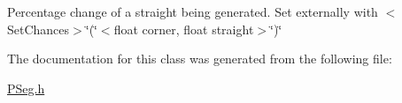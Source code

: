 Percentage change of a straight being generated. Set externally with $<$\-Set\-Chances$>$\char`\"{}(\char`\"{}$<$float corner, float straight$>$\char`\"{})\char`\"{} 

The documentation for this class was generated from the following file\-:\begin{DoxyCompactItemize}
\item 
\hyperlink{_p_seg_8h}{P\-Seg.\-h}\end{DoxyCompactItemize}
